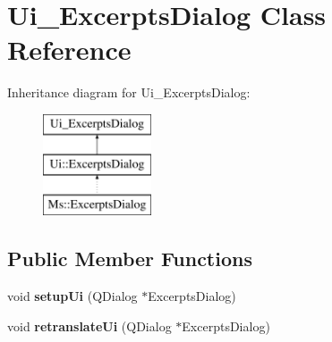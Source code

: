 \hypertarget{class_ui___excerpts_dialog}{}\section{Ui\+\_\+\+Excerpts\+Dialog Class Reference}
\label{class_ui___excerpts_dialog}
Inheritance diagram for Ui\+\_\+\+Excerpts\+Dialog\+:\begin{figure}[H]
\begin{center}
\leavevmode
\includegraphics[height=3.000000cm]{class_ui___excerpts_dialog}
\end{center}
\end{figure}
\subsection*{Public Member Functions}
\begin{DoxyCompactItemize}
\item 
\mbox{\label{class_ui___excerpts_dialog_aaae81d60998b2ad3b1367ded9b9a1a82}} 
void {\bfseries setup\+Ui} (Q\+Dialog $\ast$Excerpts\+Dialog)
\item 
\mbox{\label{class_ui___excerpts_dialog_ad55256eb5abada43a3836190ac77d5e1}} 
void {\bfseries retranslate\+Ui} (Q\+Dialog $\ast$Excerpts\+Dialog)
\end{DoxyCompactItemize}
